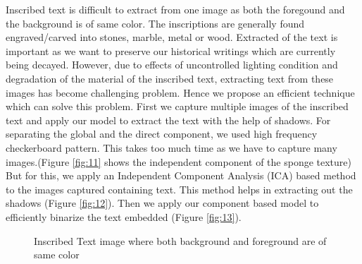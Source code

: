 Inscribed text is difficult to extract from one image as both the foregound and the background is of same 
color.
The inscriptions are generally found engraved/carved into stones, marble, metal or wood.
Extracted of the text is important as we want to preserve our historical writings which are currently being decayed.
However, due to effects of uncontrolled lighting condition and degradation of the material of the inscribed text,
extracting text from these images has become challenging problem.
Hence we propose an efficient technique which can solve this problem.
First we capture multiple images of the inscribed text and apply our model to extract the text with the help of shadows.
For separating the global and the direct component, we used high frequency checkerboard pattern. 
This takes too much time as we have to capture many images.(Figure \ref{fig:11} shows
the independent component of the sponge texture)
But for this, we apply an Independent Component Analysis (ICA) based method to the images captured containing text.
This method helps in extracting out the shadows (Figure \ref{fig:12}). 
Then we apply our component based model to efficiently binarize the text
embedded (Figure \ref{fig:13}).

\begin{figure}[t]
\centering
{}
\label{fig:subfig11}
\caption
{Inscribed Text image where both background and foreground are of same color}
\label{fig:fail}
\end{figure}

